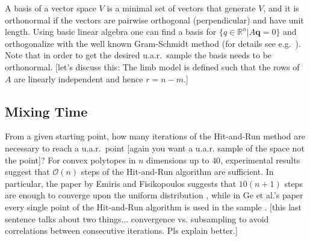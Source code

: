 A basis of a vector space $V$ is a minimal set of vectors that generate $V$, and it is orthonormal if the vectors are pairwise orthogonal (perpendicular) and have unit length. Using basic linear algebra one can find a basis for $\{q \in \mathbb{R}^n | A\textbf{q} = 0\}$ and orthogonalize with the well known Gram-Schmidt method (for details see e.g.\ \cite{Robertson}). Note that in order to get the desired u.a.r.\ sample the basis needs to be orthonormal. [let's discuss this: The limb model is defined such that the rows of $A$ are linearly independent and hence $r=n-m$.]

\subsection*{Mixing Time}
\label{sec_lengthrun}
From a given starting point, how many iterations of the Hit-and-Run method are necessary to reach a u.a.r.\ point [again you want a u.a.r. sample of the space not the point]?
For convex polytopes in $n$ dimensions up to $40$, experimental results suggest that $\mathcal{O}(n)$ steps of the Hit-and-Run algorithm are sufficient.
In particular, the paper \cite{emiris2013efficient} by Emiris and Fisikopoulos suggests that $10(n + 1)$ steps are enough to converge upon the uniform distribution \cite{emiris2013efficient}, while in Ge et al.'s paper every single point of the Hit-and-Run algorithm is used in the sample \cite{Ge}. [this last sentence talks about two things... convergence vs. subsampling to avoid correlations between consecutive iterations. Pls explain better.]


